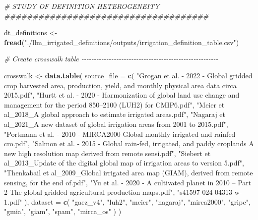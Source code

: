 \documentclass[
  11pt,
]{article}
\newenvironment{Shaded}{\begin{snugshade}}{\end{snugshade}}
\newcommand{\AttributeTok}[1]{\textcolor[rgb]{0.13,0.29,0.53}{#1}}
\newcommand{\CommentTok}[1]{\textcolor[rgb]{0.56,0.35,0.01}{\textit{#1}}}
\newcommand{\FunctionTok}[1]{\textcolor[rgb]{0.13,0.29,0.53}{\textbf{#1}}}
\newcommand{\NormalTok}[1]{#1}
\newcommand{\OtherTok}[1]{\textcolor[rgb]{0.56,0.35,0.01}{#1}}
\newcommand{\StringTok}[1]{\textcolor[rgb]{0.31,0.60,0.02}{#1}}
\begin{document}
\begin{Shaded}
\begin{Highlighting}[]
\CommentTok{\# STUDY OF DEFINITION HETEROGENEITY \#\#\#\#\#\#\#\#\#\#\#\#\#\#\#\#\#\#\#\#\#\#\#\#\#\#\#\#\#\#\#\#\#\#\#\#}

\NormalTok{dt\_definitions }\OtherTok{\textless{}{-}} \FunctionTok{fread}\NormalTok{(}\StringTok{"./llm\_irrigated\_definitions/outputs/irrigation\_definition\_table.csv"}\NormalTok{)}

\CommentTok{\# Create crosswalk table {-}{-}{-}{-}{-}{-}{-}{-}{-}{-}{-}{-}{-}{-}{-}{-}{-}{-}{-}{-}{-}{-}{-}{-}{-}{-}{-}{-}{-}{-}{-}{-}{-}{-}{-}{-}{-}{-}{-}{-}{-}{-}{-}{-}{-}{-}{-}{-}{-}{-}{-}{-}{-}{-}{-}}

\NormalTok{crosswalk }\OtherTok{\textless{}{-}} \FunctionTok{data.table}\NormalTok{(}
  \AttributeTok{source\_file =} \FunctionTok{c}\NormalTok{(}
    \StringTok{"Grogan et al. {-} 2022 {-} Global gridded crop harvested area, production, yield, and monthly physical area data circa 2015.pdf"}\NormalTok{,}
    \StringTok{"Hurtt et al. {-} 2020 {-} Harmonization of global land use change and management for the period 850–2100 (LUH2) for CMIP6.pdf"}\NormalTok{,}
    \StringTok{"Meier et al\_2018\_A global approach to estimate irrigated areas.pdf"}\NormalTok{,}
    \StringTok{"Nagaraj et al\_2021\_A new dataset of global irrigation areas from 2001 to 2015.pdf"}\NormalTok{,}
    \StringTok{"Portmann et al. {-} 2010 {-} MIRCA2000{-}Global monthly irrigated and rainfed cro.pdf"}\NormalTok{,}
    \StringTok{"Salmon et al. {-} 2015 {-} Global rain{-}fed, irrigated, and paddy croplands A new high resolution map derived from remote sensi.pdf"}\NormalTok{,}
    \StringTok{"Siebert et al\_2013\_Update of the digital global map of irrigation areas to version 5.pdf"}\NormalTok{,}
    \StringTok{"Thenkabail et al\_2009\_Global irrigated area map (GIAM), derived from remote sensing, for the end of.pdf"}\NormalTok{,}
    \StringTok{"Yu et al. {-} 2020 {-} A cultivated planet in 2010 – Part 2 The global gridded agricultural{-}production maps.pdf"}\NormalTok{,}
    \StringTok{"s41597{-}024{-}04313{-}w{-}1.pdf"}
\NormalTok{  ),}
  \AttributeTok{dataset =} \FunctionTok{c}\NormalTok{(}
    \StringTok{"gaez\_v4"}\NormalTok{,}
    \StringTok{"luh2"}\NormalTok{,}
    \StringTok{"meier"}\NormalTok{,}
    \StringTok{"nagaraj"}\NormalTok{,}
    \StringTok{"mirca2000"}\NormalTok{,}
    \StringTok{"gripc"}\NormalTok{,}
    \StringTok{"gmia"}\NormalTok{,}
    \StringTok{"giam"}\NormalTok{,}
    \StringTok{"spam"}\NormalTok{,}
    \StringTok{"mirca\_os"}
\NormalTok{  )}
\NormalTok{)}


\end{Highlighting}
\end{Shaded}
\end{document}
